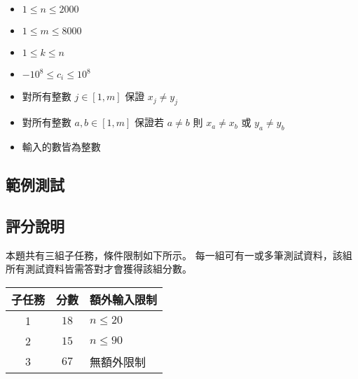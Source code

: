 \begin{itemize}
\tightlist
\item
  \begin{math}1 \le n \le 2000\end{math}
\item
  \begin{math}1 \le m \le 8000\end{math}
\item
  \begin{math}1 \le k \le n\end{math}
\item
  \begin{math}-10^8 \le c_i \le 10^8\end{math}
\item
  對所有整數 \(j \in [1, m]\) 保證 \begin{math}x_j \neq y_j\end{math}
\item
  對所有整數 \(a, b \in [1, m]\) 保證若 \begin{math}a \neq b\end{math}
  則 \begin{math}x_a \neq x_b\end{math} 或
  \begin{math}y_a \neq y_b\end{math}
\item
  輸入的數皆為整數
\end{itemize}

\subsection{範例測試}

\begin{example}
%
%
%
\end{example}

\subsection{評分說明}

本題共有三組子任務，條件限制如下所示。
每一組可有一或多筆測試資料，該組所有測試資料皆需答對才會獲得該組分數。

\begin{longtable}[]{@{}ccl@{}}
\toprule
子任務 & 分數 & 額外輸入限制 \\
\midrule
\endhead
1 & \(18\) & \begin{math}n \le 20\end{math} \\
2 & \(15\) & \begin{math}n \le 90\end{math} \\
3 & \(67\) & 無額外限制 \\
\bottomrule
\end{longtable}

